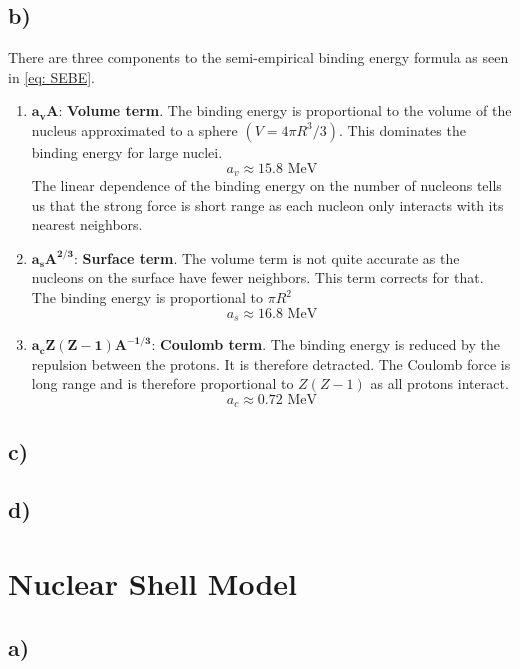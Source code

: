 \documentclass{article}
\begin{document}
\subsection*{b)}
There are three components to the semi-empirical binding energy formula as seen in \cref{eq: SEBE}. 
\begin{enumerate}
    \item $\mathbf{a_vA}$: \textbf{Volume term}. The binding energy is proportional to the volume of the nucleus approximated to a sphere $\left(V = 4πR^3/3\right)$. This dominates the binding energy for large nuclei. 
    \begin{equation}
    a_v ≈ 15.8 \text{ MeV}
    \end{equation}
    The linear dependence of the binding energy on the number of nucleons tells us that the strong force is short range as each nucleon only interacts with its nearest neighbors. 
    \item $\mathbf{a_sA^{2 / 3}}$: \textbf{Surface term}. The volume term is not quite accurate as the nucleons on the surface have fewer neighbors. This term corrects for that. The binding energy is proportional to $πR^2$
    \begin{equation}
    a_s ≈ 16.8 \text{ MeV}
    \end{equation} 
    \item $\mathbf{a_cZ(Z-1)A^{-1 / 3}}$: \textbf{Coulomb term}. The binding energy is reduced by the repulsion between the protons. It is therefore detracted. The Coulomb force is long range and is therefore proportional to $Z(Z-1)$ as all protons interact. 
    \begin{equation}
    a_c ≈ 0.72 \text{ MeV}
    \end{equation}
\end{enumerate}

\subsection*{c)}


\subsection*{d)}



\section{Nuclear Shell Model}
\subsection*{a)}
\end{document}

